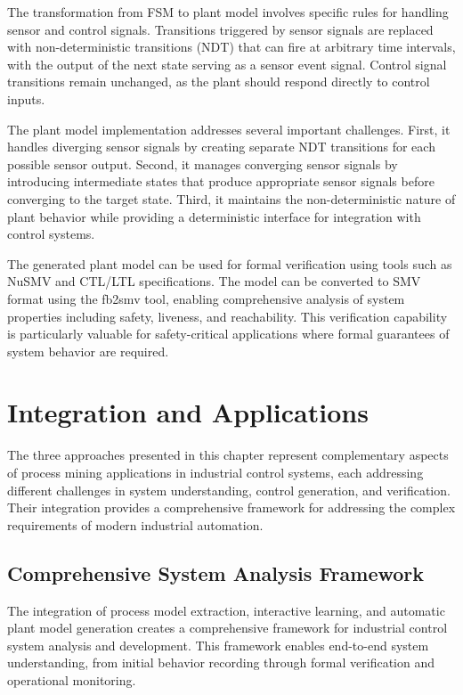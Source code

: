 The transformation from FSM to plant model involves specific rules for handling sensor and control signals. Transitions triggered by sensor signals are replaced with non-deterministic transitions (NDT) that can fire at arbitrary time intervals, with the output of the next state serving as a sensor event signal. Control signal transitions remain unchanged, as the plant should respond directly to control inputs.

The plant model implementation addresses several important challenges. First, it handles diverging sensor signals by creating separate NDT transitions for each possible sensor output. Second, it manages converging sensor signals by introducing intermediate states that produce appropriate sensor signals before converging to the target state. Third, it maintains the non-deterministic nature of plant behavior while providing a deterministic interface for integration with control systems.

The generated plant model can be used for formal verification using tools such as NuSMV and CTL/LTL specifications. The model can be converted to SMV format using the fb2smv tool, enabling comprehensive analysis of system properties including safety, liveness, and reachability. This verification capability is particularly valuable for safety-critical applications where formal guarantees of system behavior are required.

\section{Integration and Applications}

The three approaches presented in this chapter represent complementary aspects of process mining applications in industrial control systems, each addressing different challenges in system understanding, control generation, and verification. Their integration provides a comprehensive framework for addressing the complex requirements of modern industrial automation.

\subsection{Comprehensive System Analysis Framework}

The integration of process model extraction, interactive learning, and automatic plant model generation creates a comprehensive framework for industrial control system analysis and development. This framework enables end-to-end system understanding, from initial behavior recording through formal verification and operational monitoring.

